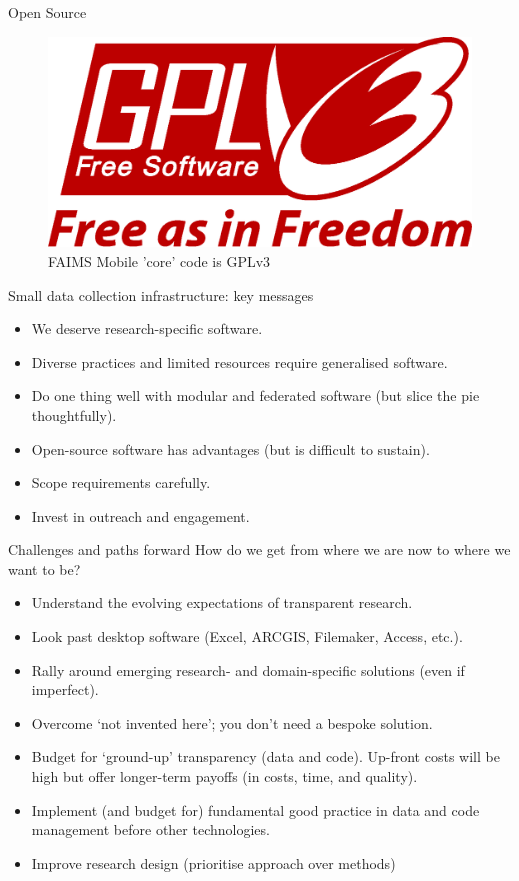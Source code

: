 \documentclass[aspectratio=169, 12pt]{beamer} %
\begin{document}
\begin{frame}{Open Source}
 \begin{figure}[H]
    \centering
        \includegraphics[width=.75\textwidth]{figures/GPLv3_Logo.eps}
        \caption{FAIMS Mobile 'core' code is GPLv3}
        \label{fig:FAIMS-github-OSS}
 \end{figure}
\end{frame}

\begin{frame}{Small data collection infrastructure: key messages}
    \begin{itemize}[label=\textbullet]
        \item We deserve research-specific software.
        \item Diverse practices and limited resources require generalised software.
        \item Do one thing well with modular and federated software (but slice the pie thoughtfully).
        \item Open-source software has advantages (but is difficult to sustain). 
        \item Scope requirements carefully.
        \item Invest in outreach and engagement.
    \end{itemize}
\end{frame}

\begin{frame}{Challenges and paths forward}
  How do we get from where we are now to where we want to be?
      \begin{itemize}[label=\textbullet]
        \item Understand the evolving expectations of transparent research. 
        \item Look past desktop software (Excel, ARCGIS, Filemaker, Access, etc.).
        \item Rally around emerging research- and domain-specific solutions (even if imperfect).
        \item Overcome `not invented here'; you don't need a bespoke solution.
        \item Budget for `ground-up' transparency (data and code). Up-front costs will be high but offer longer-term payoffs (in costs, time, and quality).
        \item Implement (and budget for) fundamental good practice in data and code management before other technologies.
        \item Improve research design (prioritise approach over methods) \cite{Muthukrishna2019-kt, Hole1973-cy}
    \end{itemize}
\end{frame}
\end{document}

